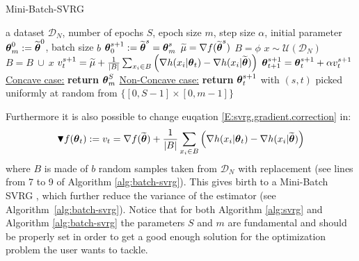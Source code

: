 \begin{algorithm}[h]
	\caption{Mini-Batch-SVRG}
	\label{alg:batch-svrg}
	\begin{algorithmic}[1]
		 a dataset $\mathcal{D}_N$, number of epochs $S$, epoch size $m$, step size $\alpha$, initial parameter $\boldsymbol{\theta}_{m}^0:=\widetilde{\boldsymbol{\theta}}^0$, batch size $b$
		\STATE $\boldsymbol{\theta}_0^{s+1} := \widetilde{\boldsymbol{\theta}}^{s} = \boldsymbol{\theta}_{m}^s$
		\STATE $\widetilde{\mu} = \nabla f(\widetilde{\boldsymbol{\theta}}^s)$
		\STATE $B=\phi$
		\STATE $x \sim \mathcal{U}\left(\mathcal{D}_N\right)$
		\STATE $B=B ~\cup~ x$
		\ENDFOR
		\STATE $v^{s+1}_t = 
		\widetilde{\mu} + 
		\frac{1}{\left|B\right|}\sum_{x_i\in B} \left(\nabla h(x_i | \boldsymbol{\theta}_t) - \nabla h(x_i | \widetilde{\boldsymbol{\theta}})\right)
		$
		\STATE $\boldsymbol{\theta}_{t+1}^{s+1} = \boldsymbol{\theta}_t^{s+1} + \alpha v^{s+1}_t$
		\ENDFOR
		\ENDFOR
		\STATE \underline{Concave case:} \textbf{return} $\boldsymbol{\theta}_{m}^S$
		\STATE \underline{Non-Concave case:} \textbf{return} $\boldsymbol{\theta}_t^{s+1}$ with $(s,t)$ picked uniformly at random from $\{[0,S-1]\times[0,m-1]\}$
	\end{algorithmic}
\end{algorithm}

Furthermore it is also possible to change euqation \ref{E:svrg.gradient.correction} in:
\begin{equation}\label{E:batch.svrg.gradient.correction}
\blacktriangledown f(\boldsymbol{\theta}_{t}) := v_t = \nabla f(\widetilde{\boldsymbol{\theta}}) + \frac{1}{\left|B\right|}\sum_{x_i\in B} \left(\nabla h(x_i | \boldsymbol{\theta}_t) - \nabla h(x_i | \widetilde{\boldsymbol{\theta}})\right)
\end{equation}
where $B$ is made of $b$ random samples taken from $\mathcal{D}_N$ with replacement (see lines from 7 to 9 of Algorithm \ref{alg:batch-svrg}). This gives birth to a Mini-Batch \acs{SVRG} \citep{reddi2016stochastic}, which further reduce the variance of the estimator (see Algorithm~\ref{alg:batch-svrg}). Notice that for both Algorithm \ref{alg:svrg} and Algorithm \ref{alg:batch-svrg} the parameters $S$ and $m$ are fundamental and should be properly set in order to get a good enough solution for the optimization problem the user wants to tackle.\newline


